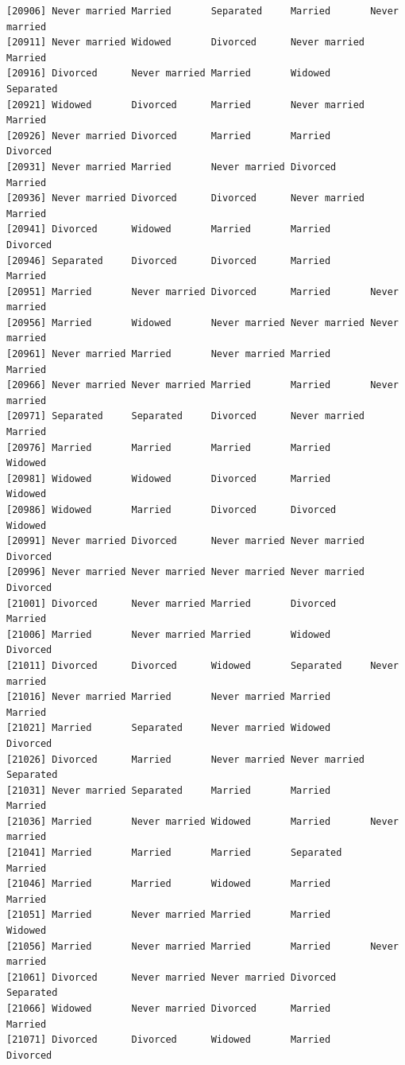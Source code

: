 \documentclass[
  letterpaper,
  DIV=11,
  numbers=noendperiod,
  oneside]{scrartcl}
\begin{document}
\begin{verbatim}
[20906] Never married Married       Separated     Married       Never married
[20911] Never married Widowed       Divorced      Never married Married      
[20916] Divorced      Never married Married       Widowed       Separated    
[20921] Widowed       Divorced      Married       Never married Married      
[20926] Never married Divorced      Married       Married       Divorced     
[20931] Never married Married       Never married Divorced      Married      
[20936] Never married Divorced      Divorced      Never married Married      
[20941] Divorced      Widowed       Married       Married       Divorced     
[20946] Separated     Divorced      Divorced      Married       Married      
[20951] Married       Never married Divorced      Married       Never married
[20956] Married       Widowed       Never married Never married Never married
[20961] Never married Married       Never married Married       Married      
[20966] Never married Never married Married       Married       Never married
[20971] Separated     Separated     Divorced      Never married Married      
[20976] Married       Married       Married       Married       Widowed      
[20981] Widowed       Widowed       Divorced      Married       Widowed      
[20986] Widowed       Married       Divorced      Divorced      Widowed      
[20991] Never married Divorced      Never married Never married Divorced     
[20996] Never married Never married Never married Never married Divorced     
[21001] Divorced      Never married Married       Divorced      Married      
[21006] Married       Never married Married       Widowed       Divorced     
[21011] Divorced      Divorced      Widowed       Separated     Never married
[21016] Never married Married       Never married Married       Married      
[21021] Married       Separated     Never married Widowed       Divorced     
[21026] Divorced      Married       Never married Never married Separated    
[21031] Never married Separated     Married       Married       Married      
[21036] Married       Never married Widowed       Married       Never married
[21041] Married       Married       Married       Separated     Married      
[21046] Married       Married       Widowed       Married       Married      
[21051] Married       Never married Married       Married       Widowed      
[21056] Married       Never married Married       Married       Never married
[21061] Divorced      Never married Never married Divorced      Separated    
[21066] Widowed       Never married Divorced      Married       Married      
[21071] Divorced      Divorced      Widowed       Married       Divorced     

\end{verbatim}
\end{document}
